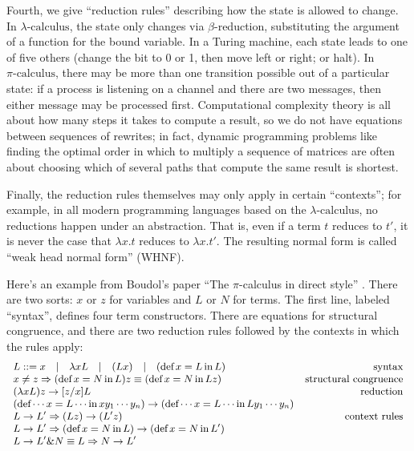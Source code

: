 \documentclass[a4paper,UKenglish]{article}
\newcommand{\pic}{$\pi\mbox{-calculus}$\xspace}
\newcommand{\lac}{$\lambda\mbox{-calculus}$\xspace}
\begin{document}
Fourth, we give ``reduction rules'' describing how the state is allowed to change.  In \lac, the state only changes via $\beta$-reduction, substituting the argument of a function for the bound variable.  In a Turing machine, each state leads to one of five others (change the bit to 0 or 1, then move left or right; or halt).  In \pic, there may be more than one transition possible out of a particular state: if a process is listening on a channel and there are two messages, then either message may be processed first. Computational complexity theory is all about how many steps it takes to compute a result, so we do not have equations between sequences of rewrites; in fact, dynamic programming problems like finding the optimal order in which to multiply a sequence of matrices are often about choosing which of several paths that compute the same result is shortest.

Finally, the reduction rules themselves may only apply in certain ``contexts''; for example, in all modern programming languages based on the \lac, no reductions happen under an abstraction. That is, even if a term $t$ reduces to $t'$, it is never the case that $\lambda x.t$ reduces to $\lambda x.t'$.  The resulting normal form is
called ``weak head normal form'' (WHNF).

Here's an example from Boudol's paper ``The $\pi$-calculus in direct style'' \cite{Boudol}.
There are two sorts: $x$ or $z$ for variables and $L$ or $N$ for
terms.  The first line, labeled ``syntax'', defines four term constructors.  There are equations for structural congruence, and there are two reduction rules followed by the contexts in which the rules apply: 
\newcommand{\deff}{\mathop{\mbox{def}}}
\newcommand{\inn}{\mathop{\mbox{in}}}
\[\small
\begin{array}{lr}
  L ::= x \quad|\quad \lambda xL \quad|\quad (Lx) \quad|\quad (\deff x = L \inn L) & \mbox{syntax}\\
  x \ne z \Rightarrow (\deff x = N \inn L)z \equiv (\deff x = N \inn Lz) & \mbox{structural congruence}\\
  (\lambda xL)z \to [z/x]L & \mbox{reduction} \\
  (\deff \cdots x = L \cdots \inn xy_1\cdots y_n) \to (\deff \cdots x = L \cdots \inn Ly_1\cdots y_n) \\
  L \to L' \Rightarrow (Lz) \to (L'z) & \mbox{context rules} \\
  L \to L' \Rightarrow (\deff x=N \inn L)
\to (\deff x=N \inn L')\\
  L \to L' \& N \equiv L \Rightarrow N \to L'
\end{array}
\]
\end{document}
